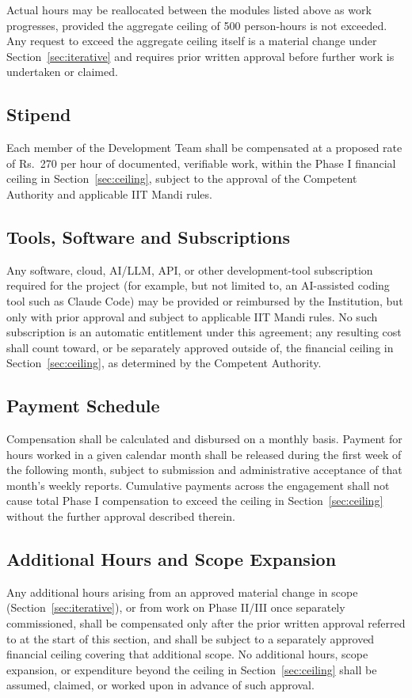 \documentclass[11pt]{article}
\begin{document}
Actual hours may be reallocated between the modules listed above as work progresses, provided the aggregate ceiling of 500 person-hours is not exceeded. Any request to exceed the aggregate ceiling itself is a material change under Section~\ref{sec:iterative} and requires prior written approval before further work is undertaken or claimed.

\subsection{Stipend}
Each member of the Development Team shall be compensated at a proposed rate of Rs.~270 per hour of documented, verifiable work, within the Phase I financial ceiling in Section~\ref{sec:ceiling}, subject to the approval of the Competent Authority and applicable IIT Mandi rules.

\subsection{Tools, Software and Subscriptions}
\label{sec:tools}
Any software, cloud, AI/LLM, API, or other development-tool subscription required for the project (for example, but not limited to, an AI-assisted coding tool such as Claude Code) may be provided or reimbursed by the Institution, but only with prior approval and subject to applicable IIT Mandi rules. No such subscription is an automatic entitlement under this agreement; any resulting cost shall count toward, or be separately approved outside of, the financial ceiling in Section~\ref{sec:ceiling}, as determined by the Competent Authority.

\subsection{Payment Schedule}
Compensation shall be calculated and disbursed on a monthly basis. Payment for hours worked in a given calendar month shall be released during the first week of the following month, subject to submission and administrative acceptance of that month's weekly reports. Cumulative payments across the engagement shall not cause total Phase I compensation to exceed the ceiling in Section~\ref{sec:ceiling} without the further approval described therein.

\subsection{Additional Hours and Scope Expansion}
Any additional hours arising from an approved material change in scope (Section~\ref{sec:iterative}), or from work on Phase II/III once separately commissioned, shall be compensated only after the prior written approval referred to at the start of this section, and shall be subject to a separately approved financial ceiling covering that additional scope. No additional hours, scope expansion, or expenditure beyond the ceiling in Section~\ref{sec:ceiling} shall be assumed, claimed, or worked upon in advance of such approval.
\end{document}
